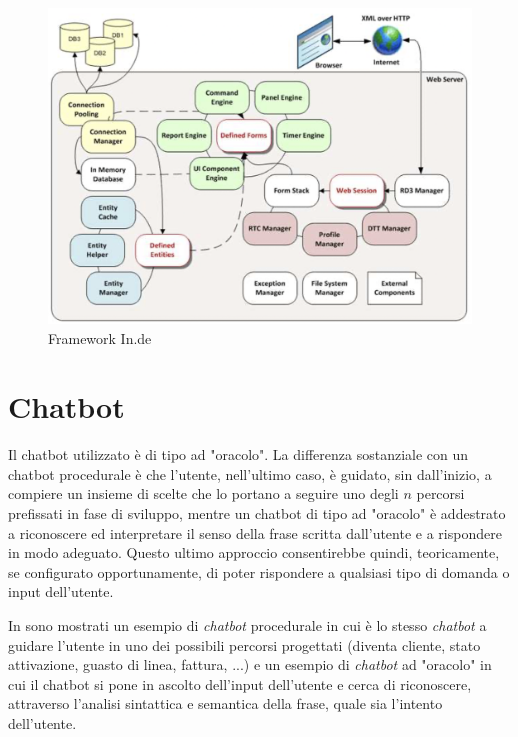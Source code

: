 \begin{figure}
    \centering{}
    \includegraphics*[width=\textwidth]{./img/framework-inde.png}
    \caption{Framework In.de}
    \label{fig:framework}
\end{figure}

\section{Chatbot}
Il chatbot utilizzato è di tipo ad "oracolo".
%
La differenza sostanziale con un chatbot procedurale è che l'utente, nell'ultimo caso, è guidato, sin dall'inizio, a compiere un insieme di scelte che lo portano a seguire uno degli $n$ percorsi prefissati in fase di sviluppo, mentre un chatbot di tipo ad "oracolo" è addestrato a riconoscere ed interpretare il senso della frase scritta dall'utente e a rispondere in modo adeguato.
%
Questo ultimo approccio consentirebbe quindi, teoricamente, se configurato opportunamente, di poter rispondere a qualsiasi tipo di domanda o input dell'utente.

In  sono mostrati un esempio di \textit{chatbot} procedurale in cui è lo stesso \textit{chatbot} a guidare l'utente in uno dei possibili percorsi progettati (diventa cliente, stato attivazione, guasto di linea, fattura, ...) e un esempio di \textit{chatbot} ad "oracolo" in cui il chatbot si pone in ascolto dell'input dell'utente e cerca di riconoscere, attraverso l'analisi sintattica e semantica della frase, quale sia l'intento dell'utente.

